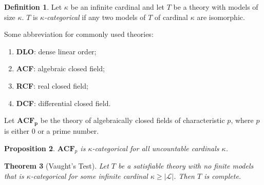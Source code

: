 \documentclass{amsart}
\newtheorem{theorem}{Theorem}[subsection]
\newtheorem{lemma}[theorem]{Lemma}
\newtheorem{proposition}[theorem]{Proposition}
\theoremstyle{definition}
\newtheorem{definition}[theorem]{Definition}
\numberwithin{equation}{section}
\begin{document}

\begin{definition}
	Let $\kappa$ be an infinite cardinal and let $T$ be a theory with models of size $\kappa$.
	$T$ is \emph{$\kappa$-categorical} if any two models of $T$ of cardinal $\kappa$ are isomorphic.
\end{definition}

\begin{tcolorbox}
	Some abbreviation for commonly used theories:
	\begin{enumerate}[label = {}]
		\item \textbf{DLO}: dense linear order;
		\item \textbf{ACF}: algebraic closed field;
		\item \textbf{RCF}: real closed field;
		\item \textbf{DCF}: differential closed field.
	\end{enumerate}
\end{tcolorbox}

Let $\mathbf{ACF_p}$ be the theory of algebraically closed fields of characteristic $p$,
where $p$ is either $0$ or a prime number.

\begin{proposition}
	$\mathbf{ACF}_p$ is $\kappa$-categorical for all uncountable cardinals $\kappa$.
\end{proposition}

\begin{theorem}[Vaught's Test]
	Let $T$ be a satisfiable theory with no finite models that is
	$\kappa$-categorical for some infinite cardinal $\kappa \ge |\mathcal{L}|$.
	Then $T$ is complete.
\end{theorem}


\end{document}
